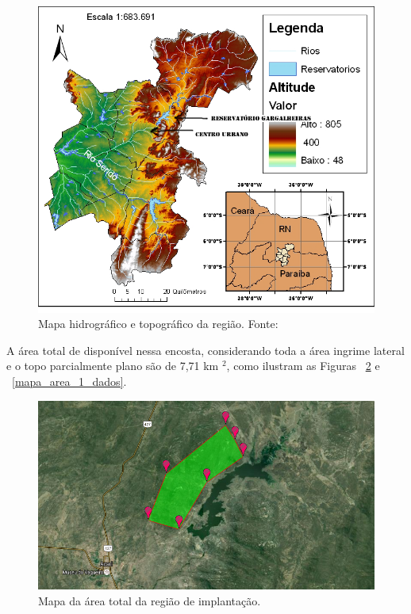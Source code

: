     \begin{figure}[h]
    \begin{center}
      \includegraphics[scale=0.4]{editaveis/figuras/mapa_topografico}
      \caption[Mapa hidrográfico e topográfico da região]{Mapa hidrográfico e topográfico da região. Fonte: \cite{olimpio07}}
      \label{mapa_topografico}
    \end{center}
    \end{figure}
    \FloatBarrier
    
    A área total de disponível nessa encosta, considerando toda a área ingrime lateral e o topo parcialmente
    plano são de 7,71 km $^2$, como ilustram as Figuras ~\ref{mapa_area_1} e ~\ref{mapa_area_1_dados}.
    
    \begin{figure}[h]
    \begin{center}
      \includegraphics[scale=0.6]{editaveis/figuras/mapa_area_1}
      \caption[Mapa da área total da região de implantação]{Mapa da área total da região de implantação. \footnotemark}
      \label{mapa_area_1}
    \end{center}
    \end{figure}
    \FloatBarrier
    
